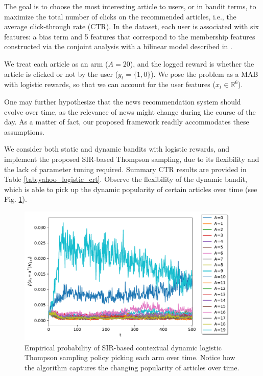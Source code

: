 \documentclass{article}
\def \Real{{\mathbb R}}
\newcommand{\ie}{i.e., }
\begin{document}
The goal is to choose the most interesting article to users, or in bandit terms, to maximize the total number of clicks on the recommended articles, \ie the average click-through rate (CTR). In the dataset, each user is associated with six features: a bias term and 5 features that correspond to the membership features constructed via the conjoint analysis with a bilinear model described in \cite{ip-Chu2009}.

We treat each article as an arm ($A=20$), and the logged reward is whether the article is clicked or not by the user ($y_t=\{1,0\}$). We pose the problem as a MAB with logistic rewards, so that we can account for the user features ($x_t\in \Real^6$).

One may further hypothesize that the news recommendation system should evolve over time, as the relevance of news might change during the course of the day. As a matter of fact, our proposed framework readily accommodates these assumptions.

We consider both static and dynamic bandits with logistic rewards, and implement the proposed SIR-based Thompson sampling, due to its flexibility and the lack of parameter tuning required. Summary CTR results are provided in Table \ref{tab:yahoo_logistic_crt}. Observe the flexibility of the dynamic bandit, which is able to pick up the dynamic popularity of certain articles over time (see Fig. \ref{fig:yahoo_logistic_dynamic}).


\begin{figure}[!hb]
	\centering
	\includegraphics[width=0.95\textwidth]{./figs/yahoo/yahoo_logistic_dynamic}
	\caption{Empirical probability of SIR-based contextual dynamic logistic Thompson sampling policy picking each arm over time. Notice how the algorithm captures the changing popularity of articles over time.}
	\label{fig:yahoo_logistic_dynamic}
\end{figure}
\end{document}

